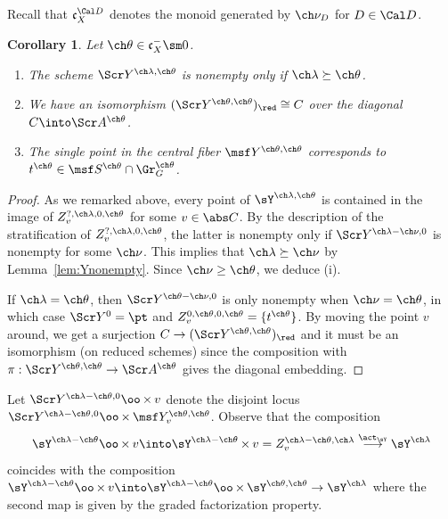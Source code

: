 \documentclass[final]{amsart}
\newtheorem{cor}[subsubsection]{Corollary}
\theoremstyle{remark}
\theoremstyle{definition}
\DeclareMathOperator*{\xt}{\times}
\numberwithin{equation}{section}
\begin{document}
Recall that $\mathfrak c_X^{\Cal D}$ denotes the monoid
generated by $\ch\nu_D$ for $D\in \Cal D$. 
\begin{cor} \label{cor:Ytheta}
Let $\ch\theta \in \mathfrak c_X^- \sm 0$. 
\begin{enumerate}
\item
The scheme $\Scr Y^{\ch\lambda,\ch\theta}$ is nonempty only if 
$\ch\lambda \succeq \ch\theta$. 

\item
We have an isomorphism $(\Scr Y^{\ch\theta,\ch\theta})_\red \cong C$ over
the diagonal $C \into \Scr A^{\ch\theta}$.

\item
The single point in the central fiber 
$\msf Y^{\ch\theta,\ch\theta}$ 
corresponds to $t^{\ch\theta} \in \msf S^{\ch\theta}\cap \Gr^{\ch\theta}_G$. 
\end{enumerate}
\end{cor}
\begin{proof}
As we remarked above, every point of $\sY^{\ch\lambda,\ch\theta}$ is contained
in the image of $Z_v^{?,\ch\lambda,0,\ch\theta}$ for some $v\in \abs C$. 
By the description of the stratification
of $Z_v^{?,\ch\lambda,0,\ch\theta}$, the latter is nonempty only
if $\Scr Y^{\ch\lambda-\ch\nu,0}$ is nonempty for some $\ch\nu$. 
This implies that $\ch\lambda \succeq \ch\nu$ by 
Lemma~\ref{lem:Ynonempty}. Since 
$\ch\nu \ge \ch\theta$, we deduce (i). 

If $\ch\lambda=\ch\theta$, then $\Scr Y^{\ch\theta-\ch\nu,0}$ 
is only nonempty when $\ch\nu=\ch\theta$, in which case $\Scr Y^0 = \pt$ and $Z_v^{0,\ch\theta,0,\ch\theta} = \{t^{\ch\theta}\}$. 
By moving the point $v$ around, we get 
a surjection $C \to (\Scr Y^{\ch\theta,\ch\theta})_\red$ and
it must be an isomorphism (on reduced schemes) since the composition 
with $\pi :\Scr Y^{\ch\theta,\ch\theta} \to \Scr A^{\ch\theta}$ gives 
the diagonal embedding.
\end{proof}

Let $\Scr Y^{\ch\lambda-\ch\theta,0} \oo\xt v$ denote the disjoint locus 
$\Scr Y^{\ch\lambda-\ch\theta,0} \oo\xt \msf Y^{\ch\theta,\ch\theta}_v$. 
Observe that the composition
\[ \sY^{\ch\lambda-\ch\theta} \oo\xt v \into 
\sY^{\ch\lambda-\ch\theta} \xt v = 
Z^{\ch\lambda-\ch\theta,\ch\lambda}_v \overset{\act_\sY}\longrightarrow
\sY^{\ch\lambda} \]
coincides with the composition 
$\sY^{\ch\lambda-\ch\theta} \oo\xt v \into 
\sY^{\ch\lambda-\ch\theta} \oo\xt \sY^{\ch\theta,\ch\theta} \to 
\sY^{\ch\lambda}$ 
where the second map is given by the graded factorization property.
\end{document}
